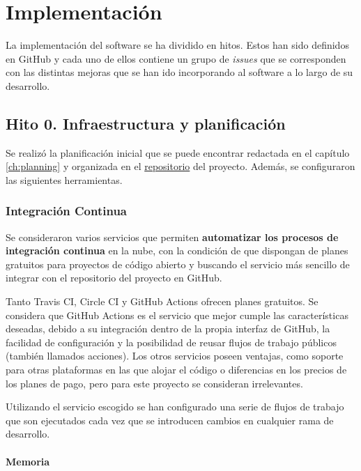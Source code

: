 \chapter{Implementación}

La implementación del software se ha dividido en hitos. Estos han sido definidos en GitHub
y cada uno de ellos contiene un grupo de \textit{issues} que se corresponden con las distintas
mejoras que se han ido incorporando al software a lo largo de su desarrollo.

\section{Hito 0. Infraestructura y planificación}

Se realizó la planificación inicial que se puede encontrar redactada en el capítulo \ref{ch:planning} y organizada en el \href{https://github.com/dipzza/ultrastar-song2txt}{repositorio} del proyecto. Además, se configuraron las siguientes herramientas.


\subsection{Integración Continua}

Se consideraron varios servicios que permiten \textbf{automatizar los procesos de integración continua} en la nube, con la condición de que dispongan de planes gratuitos para proyectos de código abierto y buscando el servicio más sencillo de integrar con el repositorio del proyecto en GitHub.

Tanto Travis CI,  Circle CI y GitHub Actions ofrecen planes gratuitos. Se considera que GitHub Actions es el servicio que mejor cumple las características deseadas, debido a su integración dentro de la propia interfaz de GitHub, la facilidad de configuración y la posibilidad de reusar flujos de trabajo públicos (también llamados acciones). Los otros servicios poseen ventajas, como soporte para otras plataformas en las que alojar el código o diferencias en los precios de los planes de pago, pero para este proyecto se consideran irrelevantes.

Utilizando el servicio escogido se han configurado una serie de flujos de trabajo que son ejecutados cada vez que se introducen cambios en cualquier rama de desarrollo.

\subsubsection{Memoria}

